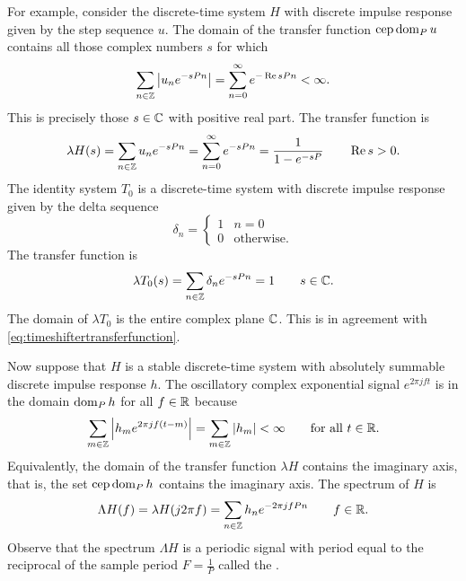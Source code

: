 For example, consider the discrete-time system $H$ with discrete impulse response given by the step sequence $u$.  The domain of the transfer function $\operatorname{cep} \operatorname{dom}_P u$ contains all those complex numbers $s$ for which
\[
\sum_{n \in {\mathbb Z}} \left\vert u_n e^{-sPn} \right\vert = \sum_{n = 0}^\infty e^{-\operatorname{Re} s Pn} < \infty.
\]
This is precisely those $s \in {\mathbb C}$ with positive real part.  The transfer function is
\[
\lambda H(s) = \sum_{n \in {\mathbb Z}} u_n e^{-sPn} = \sum_{n = 0}^\infty e^{-sPn} = \frac{1}{1 - e^{-sP}} \qquad \operatorname{Re} s > 0.
\]
The identity system $T_0$ is a discrete-time system with discrete impulse response given by the delta sequence
\[
\delta_n = \begin{cases}
1 & n = 0 \\
0 & \text{otherwise}.
\end{cases}
\]  
The transfer function is 
\[
\lambda T_0(s) = \sum_{n \in {\mathbb Z}} \delta_n e^{-sPn} = 1 \qquad s \in {\mathbb C}.
\]
The domain of $\lambda T_0$ is the entire complex plane ${\mathbb C}$.  This is in agreement with \eqref{eq:timeshiftertransferfunction}.  %


Now suppose that $H$ is a stable discrete-time system with absolutely summable discrete impulse response $h$.  The oscillatory complex exponential signal $e^{2\pi j f t}$ is in the domain $\operatorname{dom}_P h$ for all $f \in {\mathbb R}$ because
\[
\sum_{m \in {\mathbb Z}} \left\vert h_m e^{2\pi j f (t - m)} \right\vert = \sum_{m \in {\mathbb Z}} \left\vert h_m \right\vert < \infty \qquad \text{for all $t \in {\mathbb R}$}.
\]
Equivalently, the domain of the transfer function $\lambda H$ contains the imaginary axis, that is, the set $\operatorname{cep} \operatorname{dom}_P h$ contains the imaginary axis.  The spectrum of $H$ is
\[
\Lambda H(f) = \lambda H (j2\pi f) = \sum_{n \in {\mathbb Z}} h_n e^{-2\pi j f P n} \qquad f \in {\mathbb R}.
\]
Observe that the spectrum $\Lambda H$ is a periodic signal with period equal to the reciprocal of the sample period $F = \frac{1}{P}$ called the .  

